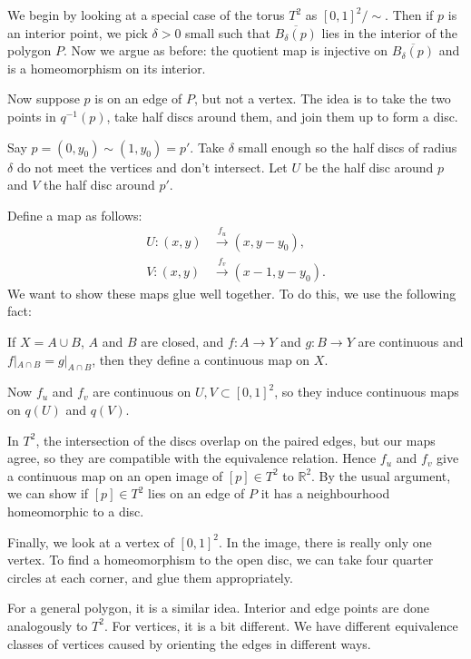 \documentclass[12pt]{article}
\begin{document}
\begin{proofbox}
	We begin by looking at a special case of the torus $T^2$ as $[0,1]^2/\sim$. Then if $p$ is an interior point, we pick $\delta > 0$ small such that $\overline{B_{\delta}(p)}$ lies in the interior of the polygon $P$. Now we argue as before: the quotient map is injective on $\overline{B_{\delta}(p)}$ and is a homeomorphism on its interior.

	Now suppose $p$ is on an edge of $P$, but not a vertex. The idea is to take the two points in $q^{-1}(p)$, take half discs around them, and join them up to form a disc.

	Say $p = (0, y_0) \sim (1, y_0) = p'$. Take $\delta$ small enough so the half discs of radius $\delta$ do not meet the vertices and don't intersect. Let $U$ be the half disc around $p$ and $V$ the half disc around $p'$.

	Define a map as follows:
	\begin{align*}
		U : (x, y) &\overset{f_u}{\to} (x, y - y_0), \\
		V : (x, y) & \overset{f_v}{\to} (x - 1, y - y_0).
	\end{align*}
	We want to show these maps glue well together. To do this, we use the following fact:

	If $X = A \cup B$, $A$ and $B$ are closed, and $f : A \to Y$ and $g : B \to Y$ are continuous and $f|_{A \cap B} = g|_{A \cap B}$, then they define a continuous map on $X$.

	Now $f_u$ and $f_v$ are continuous on $U, V \subset [0,1]^2$, so they induce continuous maps on $q(U)$ and $q(V)$.

	In $T^2$, the intersection of the discs overlap on the paired edges, but our maps agree, so they are compatible with the equivalence relation. Hence $f_u$ and $f_v$ give a continuous map on an open image of $[p] \in T^2$ to $\mathbb{R}^2$. By the usual argument, we can show if $[p] \in T^2$ lies on an edge of $P$ it has a neighbourhood homeomorphic to a disc.

	Finally, we look at a vertex of $[0,1]^2$. In the image, there is really only one vertex. To find a homeomorphism to the open disc, we can take four quarter circles at each corner, and glue them appropriately.

	For a general polygon, it is a similar idea. Interior and edge points are done analogously to $T^2$. For vertices, it is a bit different. We have different equivalence classes of vertices caused by orienting the edges in different ways.


\end{proofbox}
\end{document}
